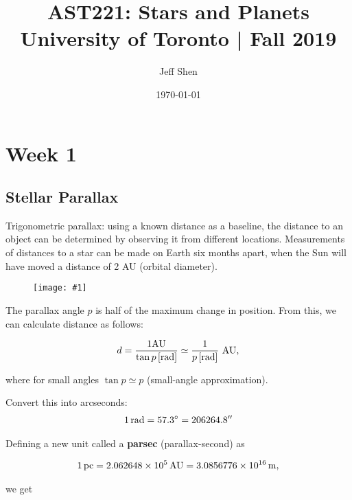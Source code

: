 \documentclass[a4paper,10pt]{article}
\newcommand{\fig}[1]{\centerline{\texttt{[image: \#1]}}}
\begin{document}
\title{AST221: Stars and Planets\\
    \Large University of Toronto | Fall 2019}
\author{Jeff Shen}
\date{\today}
\maketitle
\tableofcontents



\newpage
\section{Week 1}

\subsection{Stellar Parallax}

Trigonometric parallax: using a known distance as a baseline, the distance to an object can be determined by observing it from different locations. Measurements of distances to a star can be made on Earth six months apart, when the Sun will have moved a distance of 2 AU (orbital diameter). 

\begin{figure}[h]
    \fig{parallax}
\end{figure}

The parallax angle $p$ is half of the maximum change in position. From this, we can calculate distance as follows:

\begin{align*}
    d = \frac{1 {\rm AU}}{\tan p\,[{\rm rad}]} \simeq \frac{1}{p\,[{\rm rad}]} ~ {\rm AU},
\end{align*}

where for small angles $\tan p \simeq p$ (small-angle approximation). 

Convert this into arcseconds: 
\begin{align*}
    1\,{\rm rad} = 57.3^\circ = 206264.8''
\end{align*}

Defining a new unit called a \textbf{parsec} (parallax-second) as

\begin{align*}
    1\,{\rm pc} = 2.062648 \times 10^5\,{\rm AU} = 3.0856776 \times 10^{16}\,{\rm m},
\end{align*}

we get
\end{document}
